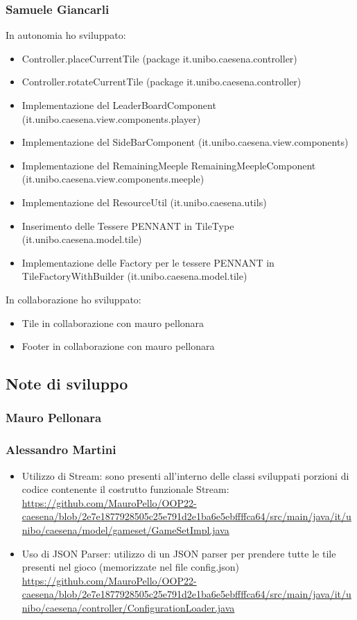 \subsubsection*{Samuele Giancarli}
In autonomia ho sviluppato:
\begin{itemize}
    \item Controller.placeCurrentTile (package it.unibo.caesena.controller)
    \item Controller.rotateCurrentTile (package it.unibo.caesena.controller)
    \item Implementazione del LeaderBoardComponent (it.unibo.caesena.view.components.player)
    \item Implementazione del SideBarComponent (it.unibo.caesena.view.components)
    \item Implementazione del RemainingMeeple RemainingMeepleComponent (it.unibo.caesena.view.components.meeple)
    \item Implementazione del ResourceUtil (it.unibo.caesena.utils)
    \item Inserimento delle Tessere PENNANT in TileType (it.unibo.caesena.model.tile)
    \item Implementazione delle Factory per le tessere PENNANT in TileFactoryWithBuilder (it.unibo.caesena.model.tile)
\end{itemize}

In collaborazione ho sviluppato:
\begin{itemize}
    \item Tile in collaborazione con mauro pellonara
    \item Footer in collaborazione con mauro pellonara
\end{itemize}

\subsection{Note di sviluppo}
\subsubsection*{Mauro Pellonara}

\subsubsection*{Alessandro Martini}
\begin{itemize}
    \item Utilizzo di Stream: sono presenti all'interno delle classi sviluppati porzioni di codice contenente il costrutto funzionale Stream: \url{https://github.com/MauroPello/OOP22-caesena/blob/2e7e1877928505c25e791d2e1ba6e5ebffffca64/src/main/java/it/unibo/caesena/model/gameset/GameSetImpl.java}
    \item Uso di JSON Parser: utilizzo di un JSON parser per prendere tutte le tile presenti nel gioco (memorizzate nel file config.json) \url{https://github.com/MauroPello/OOP22-caesena/blob/2e7e1877928505c25e791d2e1ba6e5ebffffca64/src/main/java/it/unibo/caesena/controller/ConfigurationLoader.java}
\end{itemize}

